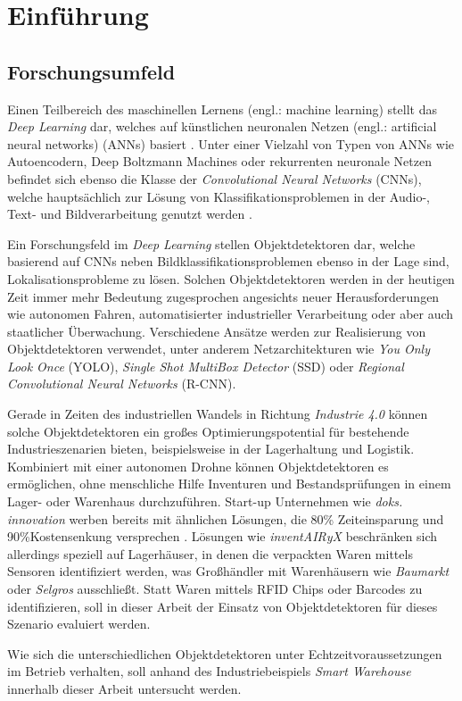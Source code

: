 \chapter{Einführung}

\section{Forschungsumfeld}

Einen Teilbereich des maschinellen Lernens (engl.: machine learning) stellt das \textit{Deep Learning} dar, welches auf künstlichen neuronalen Netzen (engl.: artificial neural networks) (ANNs) basiert \cite{AurelienGeron.2018}. Unter einer Vielzahl von Typen von ANNs wie Autoencodern, Deep Boltzmann Machines oder rekurrenten neuronale Netzen befindet sich ebenso die Klasse der \textit{Convolutional Neural Networks} (CNNs), welche hauptsächlich zur Lösung von Klassifikationsproblemen in der Audio-, Text- und Bildverarbeitung genutzt werden \cite{MathWorks.2019}.

Ein Forschungsfeld im \textit{Deep Learning} stellen Objektdetektoren dar, welche basierend auf CNNs neben Bildklassifikationsproblemen ebenso in der Lage sind, Lokalisationsprobleme zu lösen. Solchen Objektdetektoren werden in der heutigen Zeit immer mehr Bedeutung zugesprochen angesichts neuer Herausforderungen wie autonomen Fahren, automatisierter industrieller Verarbeitung oder aber auch staatlicher Überwachung. Verschiedene Ansätze werden zur Realisierung von Objektdetektoren verwendet, unter anderem Netzarchitekturen wie \textit{You Only Look Once} (YOLO), \textit{Single Shot MultiBox Detector} (SSD) oder \textit{Regional Convolutional Neural Networks} (R-CNN). 

Gerade in Zeiten des industriellen Wandels in Richtung \textit{Industrie 4.0} können solche Objektdetektoren ein großes Optimierungspotential für bestehende Industrieszenarien bieten, beispielsweise in der Lagerhaltung und Logistik. Kombiniert mit einer autonomen Drohne können Objektdetektoren es ermöglichen, ohne menschliche Hilfe Inventuren und Bestandsprüfungen in einem Lager- oder Warenhaus durchzuführen. Start-up Unternehmen wie \textit{doks. innovation} werben bereits mit ähnlichen Lösungen, die 80\% Zeiteinsparung und 90\%Kostensenkung versprechen \cite{doks.innovation.2019}. Lösungen wie \textit{inventAIRyX} beschränken sich allerdings speziell auf Lagerhäuser, in denen die verpackten Waren mittels Sensoren identifiziert werden, was Großhändler mit Warenhäusern wie \textit{Baumarkt} oder \textit{Selgros} ausschließt. Statt Waren mittels RFID Chips oder Barcodes zu identifizieren, soll in dieser Arbeit der Einsatz von Objektdetektoren für dieses Szenario evaluiert werden.

Wie sich die unterschiedlichen Objektdetektoren unter Echtzeitvoraussetzungen im Betrieb verhalten, soll anhand des Industriebeispiels \textit{Smart Warehouse} innerhalb dieser Arbeit untersucht werden. 

